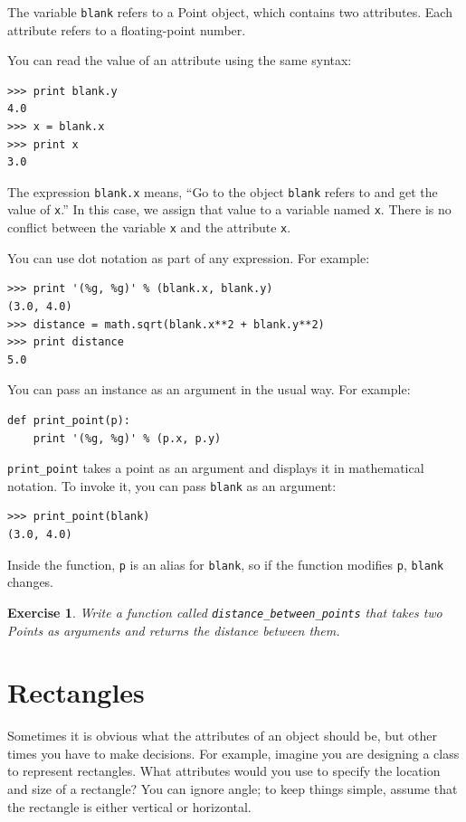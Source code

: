 \documentclass[12pt,a4paper,final,twoside,onecolumn,titlepage]{book}
\newtheorem{exercise}{Exercise}[chapter]
\begin{document}
The variable {\tt blank} refers to a Point object, which
contains two attributes.  Each attribute refers to a
floating-point number.

You can read the value of an attribute using the same syntax:

\begin{verbatim}
>>> print blank.y
4.0
>>> x = blank.x
>>> print x
3.0
\end{verbatim}
%
The expression {\tt blank.x} means, ``Go to the object {\tt blank}
refers to and get the value of {\tt x}.'' In this case, we assign that
value to a variable named {\tt x}.  There is no conflict between
the variable {\tt x} and the attribute {\tt x}.

You can use dot notation as part of any expression.  For example:

\begin{verbatim}
>>> print '(%g, %g)' % (blank.x, blank.y)
(3.0, 4.0)
>>> distance = math.sqrt(blank.x**2 + blank.y**2)
>>> print distance
5.0
\end{verbatim}
%
You can pass an instance as an argument in the usual way.
For example:

\begin{verbatim}
def print_point(p):
    print '(%g, %g)' % (p.x, p.y)
\end{verbatim}
%
\verb"print_point" takes a point as an argument and displays it in
mathematical notation.  To invoke it, you can pass {\tt blank} as
an argument:

\begin{verbatim}
>>> print_point(blank)
(3.0, 4.0)
\end{verbatim}
%
Inside the function, {\tt p} is an alias for {\tt blank}, so if
the function modifies {\tt p}, {\tt blank} changes.


\begin{exercise}

Write a function called \verb"distance_between_points" that takes two
Points as arguments and returns the distance between them.

\end{exercise}



\section{Rectangles}
\label{rectangles}

Sometimes it is obvious what the attributes of an object should be,
but other times you have to make decisions.  For example, imagine you
are designing a class to represent rectangles.  What attributes would
you use to specify the location and size of a rectangle?  You can
ignore angle; to keep things simple, assume that the rectangle is
either vertical or horizontal.
\end{document}
